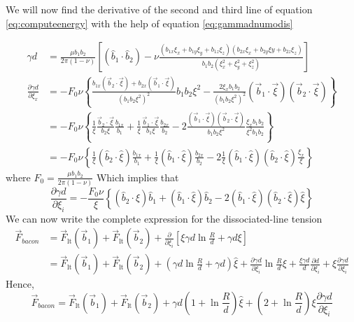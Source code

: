 \documentclass[10pt,a4paper,final]{article}
\begin{document}
We will now find the derivative of the second and third line of equation \ref{eq:computeenergy} with the help of equation \ref{eq:gammadnumodis}

\begin{equation*}
\begin{split}
\gamma d &= \frac{\mu b_1b_2}{2\pi(1-\nu)} \left[\left(\hat{b}_1\cdot\hat{b}_2\right)-\nu\frac{\left(b_{1x}\xi_{x}+b_{1y}\xi_{y}+b_{1z}\xi_{z}\right)\left(b_{2x}\xi_{x}+b_{2y}\xi{y}+b_{2z}\xi_{z}\right)}{b_1b_2\left(\xi_x^2+\xi_y^2+\xi_z^2\right)}\right]\\
\frac{\partial\gamma d}{\partial\xi_x} &= -F_0\nu\left\lbrace \frac{b_{1x}\left(\vec{b}_2\cdot\vec{\xi}\right) + b_{2x}\left(\vec{b}_1\cdot\vec{\xi}\right)}{\left(b_1b_2\xi^2\right)^2}b_1b_2\xi^2
 -\frac{2\xi_xb_1b_2}{\left(b_1b_2\xi^2\right)^2}\left(\vec{b}_1\cdot\vec{\xi}\right)\left(\vec{b}_2\cdot\vec{\xi}\right) \right\rbrace \\
 &= -F_0\nu\left\lbrace \frac{1}{\xi}\frac{\vec{b}_2\cdot\vec{\xi}}{b_2\xi}\frac{b_{1x}}{b_1} + \frac{1}{\xi}\frac{\vec{b}_1\cdot\vec{\xi}}{b_1\xi}\frac{b_{2x}}{b_2}
 -2\frac{\left(\vec{b}_1\cdot\vec{\xi}\right)\left(\vec{b}_2\cdot\vec{\xi}\right)}{b_1b_2\xi^2}\frac{\xi_xb_1b_2}{\xi^2b_1b_2}\right\rbrace \\
 &= -F_0\nu\left\lbrace \frac{1}{\xi}\left(\hat{b}_2\cdot\hat{\xi}\right)\frac{b_{1x}}{b_1} + \frac{1}{\xi}\left(\hat{b}_1\cdot\hat{\xi}\right)\frac{b_{2x}}{b_2} - 2\frac{1}{\xi}\left(\hat{b}_1\cdot\hat{\xi}\right)\left(\hat{b}_2\cdot\hat{\xi}\right)\frac{\xi_x}{\xi} \right\rbrace
\end{split}
\end{equation*}
where $F_0 = \frac{\mu b_1b_2}{2\pi(1-\nu)}$
Which implies that
\begin{equation}
\frac{\partial\gamma d}{\partial\xi_i} = 
-\frac{F_0\nu}{\xi}\left\lbrace  
\left(\hat{b}_2\cdot\hat{\xi}\right)\hat{b}_1 + 
\left(\hat{b}_1\cdot\hat{\xi}\right)\hat{b}_2 - 
2\left(\hat{b}_1\cdot\hat{\xi}\right)\left(\hat{b}_2\cdot\hat{\xi}\right)\hat{\xi}
\right\rbrace
\label{eq:forcegammad}
\end{equation}
We can now write the complete expression for the dissociated-line tension
\begin{equation*}
\begin{split}
\vec{F}_{bacon} &= \vec{F}_\text{lt}(\vec{b}_1) + \vec{F}_\text{lt}(\vec{b}_2) + 
\frac{\partial}{\partial \xi_i}\left[\xi \gamma d \ln\frac{R}{d} + \gamma d\xi\right]\\
&= \vec{F}_\text{lt}(\vec{b}_1) + \vec{F}_\text{lt}(\vec{b}_2) +
\left(\gamma d\ln\frac{R}{d} + \gamma d\right)\hat{\xi} + 
\frac{\partial\gamma d}{\partial\xi_i}\ln\frac{R}{d}\xi +
\frac{\xi\gamma d}{d}\frac{\partial d}{\partial\xi_i} +
\xi\frac{\partial\gamma d}{\partial\xi_i}
\end{split}
\end{equation*}
Hence,
\begin{equation}
\boxed{\vec{F}_{bacon} = \vec{F}_\text{lt}(\vec{b}_1) + \vec{F}_\text{lt}(\vec{b}_2) +
\gamma d\left(1+\ln\frac{R}{d}\right)\hat{\xi} + \left(2+\ln\frac{R}{d}\right)\xi\frac{\partial \gamma d}{\partial \xi_i}}
\label{eq:forcebaconlt}
\end{equation}


\end{document}
